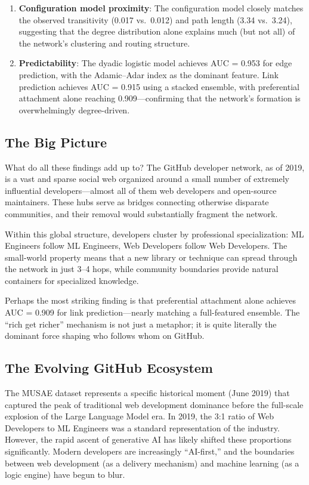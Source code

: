 \documentclass[letterpaper]{article}
\begin{document}
\begin{enumerate}
  \item \textbf{Configuration model proximity}: The configuration model closely matches the observed transitivity (0.017 vs.\ 0.012) and path length (3.34 vs.\ 3.24), suggesting that the degree distribution alone explains much (but not all) of the network's clustering and routing structure.

  \item \textbf{Predictability}: The dyadic logistic model achieves AUC = 0.953 for edge prediction, with the Adamic--Adar index as the dominant feature. Link prediction achieves AUC = 0.915 using a stacked ensemble, with preferential attachment alone reaching 0.909---confirming that the network's formation is overwhelmingly degree-driven.
\end{enumerate}

\subsection{The Big Picture}

What do all these findings add up to? The GitHub developer network, as of 2019, is a vast and sparse social web organized around a small number of extremely influential developers---almost all of them web developers and open-source maintainers. These hubs serve as bridges connecting otherwise disparate communities, and their removal would substantially fragment the network.

Within this global structure, developers cluster by professional specialization: ML Engineers follow ML Engineers, Web Developers follow Web Developers. The small-world property means that a new library or technique can spread through the network in just 3--4 hops, while community boundaries provide natural containers for specialized knowledge.

Perhaps the most striking finding is that preferential attachment alone achieves AUC = 0.909 for link prediction---nearly matching a full-featured ensemble. The ``rich get richer'' mechanism is not just a metaphor; it is quite literally the dominant force shaping who follows whom on GitHub.

\subsection{The Evolving GitHub Ecosystem}

The MUSAE dataset represents a specific historical moment (June 2019) that captured the peak of traditional web development dominance before the full-scale explosion of the Large Language Model era. In 2019, the 3:1 ratio of Web Developers to ML Engineers was a standard representation of the industry. However, the rapid ascent of generative AI has likely shifted these proportions significantly. Modern developers are increasingly ``AI-first,'' and the boundaries between web development (as a delivery mechanism) and machine learning (as a logic engine) have begun to blur.
\end{document}
